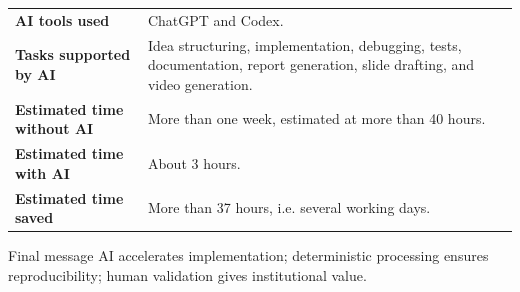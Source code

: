 \begin{frame}[t]

  \small

  \begin{tabular}{>{\bfseries}p{}p{}}
    AI tools used & ChatGPT and Codex. \\
    Tasks supported by AI & Idea structuring, implementation, debugging, tests, documentation, report generation, slide drafting, and video generation. \\
    Estimated time without AI & More than one week, estimated at more than 40 hours. \\
    Estimated time with AI & About 3 hours. \\
    Estimated time saved & More than 37 hours, i.e. several working days. \\
  \end{tabular}

  \vspace{0.7cm}

  \begin{block}{Final message}
    AI accelerates implementation; deterministic processing ensures reproducibility; human validation gives institutional value.
  \end{block}
\end{frame}


